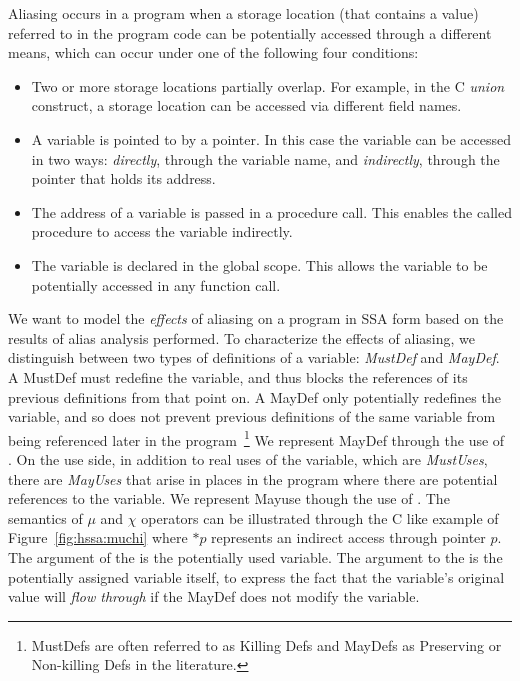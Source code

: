 Aliasing\index{\mufun}\index{\chifun} occurs in a program when a storage location (that contains a value) referred to in the program code can be potentially 
accessed through a different means, which can occur under one of the following four conditions:
\begin{itemize}
\item Two or more storage locations partially overlap. For example, in the C \emph{union} construct, a storage location can be accessed via different field names.
\item A variable is pointed to by a pointer.
In this case the variable can be accessed in two ways: {\em directly}, through the variable name, and {\em indirectly}, through the pointer that holds its address.
\item The address of a variable is passed in a procedure call. This enables the called procedure to access the variable indirectly.
\item The variable is declared in the global scope.  This allows the variable to be potentially accessed in any function call.
\end{itemize}

We want to model the {\em effects} of aliasing on a program in SSA form based
on the results of alias analysis performed.
To characterize the effects of aliasing, we distinguish between two types of definitions of a variable: {\em MustDef} and {\em MayDef}.
A MustDef must redefine the variable, and thus blocks the references of its 
previous definitions from that point on.
A MayDef only potentially redefines the variable, and so does not prevent 
previous definitions of the same variable from being referenced later in the
program~\footnote{MustDefs are often referred to as Killing Defs and MayDefs
as Preserving or Non-killing Defs in the literature.}
We represent MayDef through the use of \chifuns.
On the use side, in addition to real uses of the variable, which are {\em MustUses}, there are {\em MayUses} that arise in places in the program where there
are potential references to the variable.  
We represent Mayuse though the use of \mufuns.
The semantics of $\mu$ and $\chi$ operators can be illustrated through the C like example of Figure~\ref{fig:hssa:muchi} where $*p$ represents an indirect access through pointer $p$.
The argument of the \muop is the potentially used variable.
The argument to the \chiop is the potentially assigned variable itself, to
express the fact that the variable's original value will \emph{flow through} if
the MayDef does not modify the variable.

